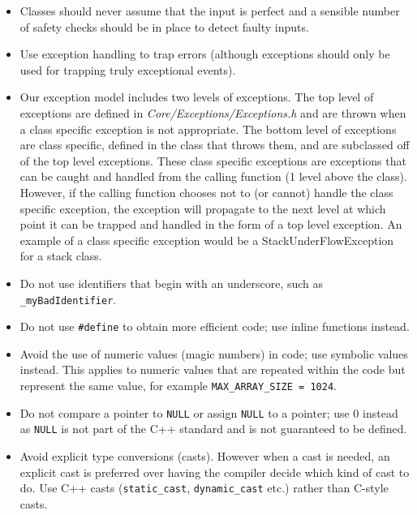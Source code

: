 \documentclass[fleqn,12pt,openany]{book}
\begin{document}
\begin{itemize}
\item
Classes should never assume that the input is perfect and a sensible number
of safety checks should be in place to detect faulty inputs. 

\item
Use exception handling to trap errors (although exceptions should only be
used for trapping truly exceptional events).

\item
Our exception model includes two levels of exceptions.
The top level of exceptions are defined in \emph{Core/Exceptions/Exceptions.h}
and are thrown when a class specific exception is not appropriate.
The bottom level of exceptions are class specific, defined in the class that
throws them, and are subclassed off of the top level exceptions.
These class specific exceptions are exceptions that can be caught and handled
from the calling function (1 level above the class).
However, if the calling function chooses not to (or cannot) handle the class
specific exception, the exception will propagate to the next level at which
point it can be trapped and handled in the form of a top level exception.
An example of a class specific exception would be a StackUnderFlowException for a stack class.

\item
Do not use identifiers that begin with an underscore,
such as \texttt{\_myBadIdentifier}.

\item
Do not use \texttt{\#define} to obtain more efficient code; use inline functions instead.

\item
Avoid the use of numeric values (magic numbers) in code; use symbolic values instead.
This applies to numeric values that are repeated within the code but
represent the same value, for example \texttt{MAX\_ARRAY\_SIZE = 1024}.

\item
Do not compare a pointer to \texttt{NULL} or assign \texttt{NULL} to a pointer;
use 0 instead as \texttt{NULL} is not part of the C++ standard and is not
guaranteed to be defined.

\item
Avoid explicit type conversions (casts).
However when a cast is needed, an explicit cast is preferred over having the
compiler decide which kind of cast to do.
Use C++ casts (\texttt{static\_cast}, \texttt{dynamic\_cast} etc.) rather than C-style casts.


\end{itemize}
\end{document}
